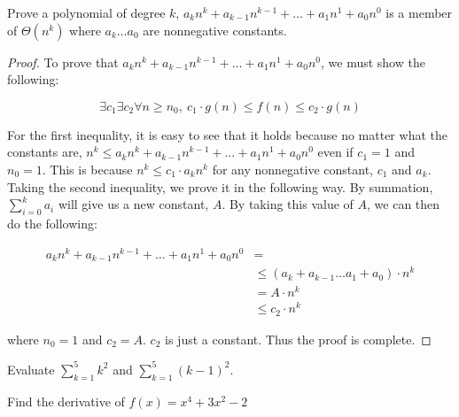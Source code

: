 \documentclass{article}
\begin{document}
\begin{homeworkProblem}
	Prove a polynomial of degree \(k\), \(a_kn^k + a_{k - 1}n^{k - 1} + \hdots
	+ a_1n^1 + a_0n^0\) is a member of \(\Theta(n^k)\) where \(a_k \hdots a_0\)
	are nonnegative constants.
	
	\begin{proof}
		To prove that \(a_kn^k + a_{k - 1}n^{k - 1} + \hdots + a_1n^1 +
		a_0n^0\), we must show the following:
		
		\[
		\exists c_1 \exists c_2 \forall n \geq n_0,\ {c_1 \cdot g(n) \leq
			f(n) \leq c_2 \cdot g(n)}
		\]
		
		For the first inequality, it is easy to see that it holds because no
		matter what the constants are, \(n^k \leq a_kn^k + a_{k - 1}n^{k - 1} +
		\hdots + a_1n^1 + a_0n^0\) even if \(c_1 = 1\) and \(n_0 = 1\).  This
		is because \(n^k \leq c_1 \cdot a_kn^k\) for any nonnegative constant,
		\(c_1\) and \(a_k\).
		\\
		
		Taking the second inequality, we prove it in the following way.
		By summation, \(\sum\limits_{i=0}^k a_i\) will give us a new constant,
		\(A\). By taking this value of \(A\), we can then do the following:
		
		\[
		\begin{split}
		a_kn^k + a_{k - 1}n^{k - 1} + \hdots + a_1n^1 + a_0n^0 &=
		\\
		&\leq (a_k + a_{k - 1} \hdots a_1 + a_0) \cdot n^k
		\\
		&= A \cdot n^k
		\\
		&\leq c_2 \cdot n^k
		\end{split}
		\]
		
		where \(n_0 = 1\) and \(c_2 = A\). \(c_2\) is just a constant. Thus the
		proof is complete.
	\end{proof}
\end{homeworkProblem}

\pagebreak

%
%

\begin{homeworkProblem}[18]
	Evaluate \(\sum_{k=1}^{5} k^2\) and \(\sum_{k=1}^{5} (k - 1)^2\).
\end{homeworkProblem}

\begin{homeworkProblem}
	Find the derivative of \(f(x) = x^4 + 3x^2 - 2\)
\end{homeworkProblem}
\end{document}
